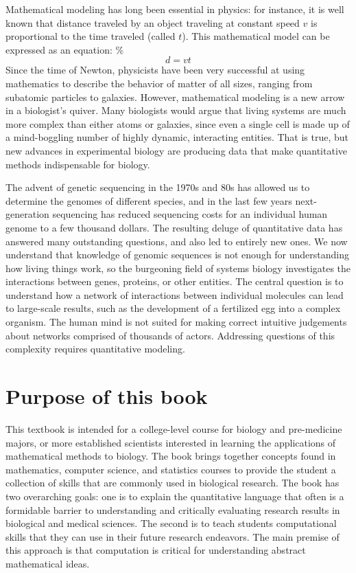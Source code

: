 \documentclass[
]{book}
\begin{document}
Mathematical modeling has long been essential in physics: for instance, it is well known that distance traveled by an object traveling at constant speed \(v\) is proportional to the time traveled (called \(t\)). This mathematical model can be expressed as an equation:
\%\[d = vt\]
Since the time of Newton, physicists have been very successful at using mathematics to describe the behavior of matter of all sizes, ranging from subatomic particles to galaxies. However, mathematical modeling is a new arrow in a biologist's quiver. Many biologists would argue that living systems are much more complex than either atoms or galaxies, since even a single cell is made up of a mind-boggling number of highly dynamic, interacting entities. That is true, but new advances in experimental biology are producing data that make quantitative methods indispensable for biology.

The advent of  genetic sequencing in the 1970s and 80s has allowed us to determine the genomes of different species, and in the last few years  next-generation sequencing has reduced sequencing costs for an individual human genome to a few thousand dollars. The resulting deluge of quantitative data has answered many outstanding questions, and also led to entirely new ones. We now understand that knowledge of genomic sequences is not enough for understanding how living things work, so the burgeoning field of  systems biology investigates the interactions between genes, proteins, or other entities. The central question is to understand how a network of interactions between individual molecules can lead to large-scale results, such as the development of a fertilized egg into a complex organism. The human mind is not suited for making correct intuitive judgements about networks comprised of thousands of actors. Addressing questions of this complexity requires quantitative modeling.

\hypertarget{purpose-of-this-book}{%
\section{Purpose of this book}\label{purpose-of-this-book}}

This textbook is intended for a college-level course for biology and pre-medicine majors, or more established scientists interested in learning the applications of mathematical methods to biology. The book brings together concepts found in mathematics, computer science, and statistics courses to provide the student a collection of skills that are commonly used in biological research. The book has two overarching goals: one is to explain the quantitative language that often is a formidable barrier to understanding and critically evaluating research results in biological and medical sciences. The second is to teach students computational skills that they can use in their future research endeavors. The main premise of this approach is that computation is critical for understanding abstract mathematical ideas.
\end{document}
